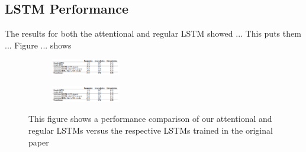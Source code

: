 
\subsection{LSTM Performance}

The results for both the attentional and regular LSTM showed ... This puts them ... Figure ... shows 

\begin{figure}
\centering
\begin{subfigure}{\textwidth}
  \centering
  \includegraphics[width=3cm]{images/test_image.PNG}
  \label{fig:sub1}
\end{subfigure}%
\begin{subfigure}{\textwidth}
  \centering
  \includegraphics[width=3cm]{images/test_image.PNG}
  \label{fig:sub2}
\end{subfigure}
\caption{This figure shows a performance comparison of our attentional and regular LSTMs versus the respective LSTMs trained in the original paper}
\label{fig:test}
\end{figure}


